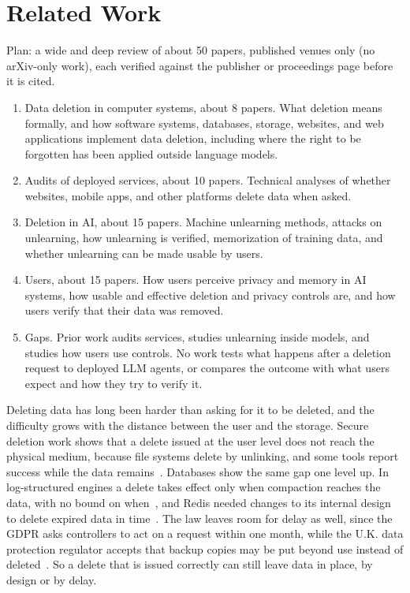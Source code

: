 \section{Related Work}
\label{sec:related}

\begin{outlinenote}
Plan: a wide and deep review of about 50 papers, published venues only (no arXiv-only work), each verified against the publisher or proceedings page before it is cited.
\begin{enumerate}[leftmargin=*,nosep]
\item Data deletion in computer systems, about 8 papers. What deletion means formally, and how software systems, databases, storage, websites, and web applications implement data deletion, including where the right to be forgotten has been applied outside language models.
\item Audits of deployed services, about 10 papers. Technical analyses of whether websites, mobile apps, and other platforms delete data when asked.
\item Deletion in AI, about 15 papers. Machine unlearning methods, attacks on unlearning, how unlearning is verified, memorization of training data, and whether unlearning can be made usable by users.
\item Users, about 15 papers. How users perceive privacy and memory in AI systems, how usable and effective deletion and privacy controls are, and how users verify that their data was removed.
\item Gaps. Prior work audits services, studies unlearning inside models, and studies how users use controls. No work tests what happens after a deletion request to deployed LLM agents, or compares the outcome with what users expect and how they try to verify it.
\end{enumerate}
\end{outlinenote}

Deleting data has long been harder than asking for it to be deleted, and the difficulty grows with the distance between the user and the storage. Secure deletion work shows that a delete issued at the user level does not reach the physical medium, because file systems delete by unlinking, and some tools report success while the data remains~\cite{reardon2013sok}. Databases show the same gap one level up. In log-structured engines a delete takes effect only when compaction reaches the data, with no bound on when~\cite{sarkar2020lethe}, and Redis needed changes to its internal design to delete expired data in time~\cite{shastri2020understanding}. The law leaves room for delay as well, since the GDPR asks controllers to act on a request within one month, while the U.K. data protection regulator accepts that backup copies may be put beyond use instead of deleted~\cite{politou2018backups,gdpr2016}. So a delete that is issued correctly can still leave data in place, by design or by delay.

